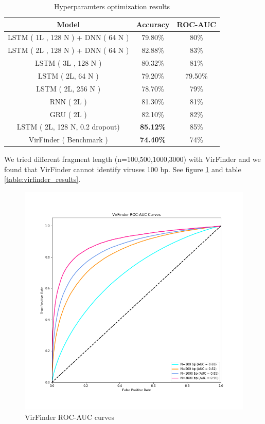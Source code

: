 \documentclass[conference]{IEEEtran}
\begin{document}
\begin{table}[h!]
	\centering
	\begin{tabular}{||c c c||} 
		Model &	Accuracy&	ROC-AUC \\ [0.5ex] 
		\hline\hline
		LSTM ( 1L , 128 N ) + DNN ( 64 N ) &	79.80\% &	80\% \\
		LSTM ( 2L , 128 N ) + DNN ( 64 N ) &	82.88\%	& 83\% \\
		LSTM ( 3L , 128 N )  &	80.32\%	& 81\% \\ 
		LSTM ( 2L, 64 N ) &	79.20\%	& 79.50\% \\ 
		LSTM ( 2L, 256 N ) &	78.70\%	& 79\% \\
		RNN ( 2L ) &	81.30\%	& 81\% \\
		GRU ( 2L ) &	82.10\% &	82\% \\
		LSTM ( 2L, 128 N, 0.2 dropout) &	\textbf{85.12\%} 	& 85\% \\
		VirFinder ( Benchmark ) &	\textbf{74.40\%} &	74\% \\[1ex]
	\end{tabular}
	\caption{Hyperparamters optimization results}
	\label{table:model_results}
\end{table}

We tried different fragment length (n=100,500,1000,3000) with VirFinder and we found that VirFinder cannot identify viruses 100 bp. See figure \ref{fig:roc_auc_virfinder} and table \ref{table:virfinder_results}.

\begin{figure}
	\centering
	\includegraphics[width=\columnwidth]{imgs/roc_auc.png}
	\caption{VirFinder ROC-AUC curves}
	\label{fig:roc_auc_virfinder}
\end{figure}
\end{document}
